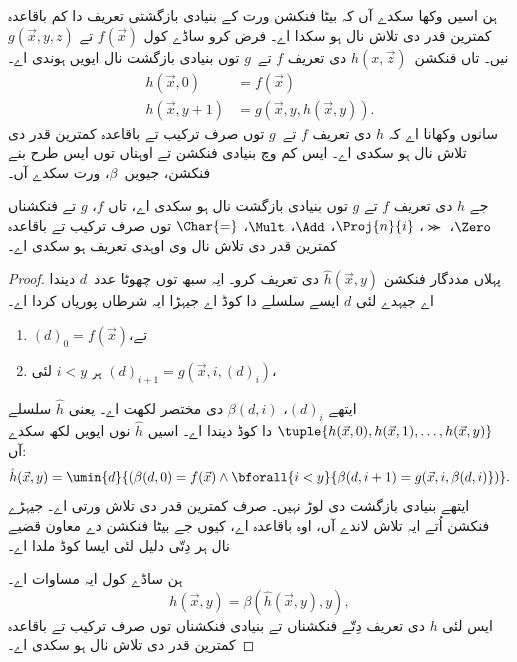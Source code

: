 \documentclass[../../../include/open-logic-section]{subfiles}
\begin{document}

ہن اسیں وکھا سکدے آں کہ بیٹا فنکشن ورت کے بنیادی بازگشتی
تعریف دا کم باقاعدہ کمترین قدر دی تلاش نال ہو سکدا اے۔ فرض کرو ساڈے کول
$f(\vec x)$ تے $g(\vec x, y, z)$
نیں۔ تاں فنکشن~$h(x,\vec z)$ دی تعریف $f$ تے~$g$ توں بنیادی بازگشت
نال ایویں ہوندی اے۔
\begin{align*}
h(\vec x, 0) & =  f(\vec x) \\
h(\vec x, y+1) & =  g(\vec x, y, h(\vec x, y)).
\end{align*}
سانوں وکھانا اے کہ $h$ دی تعریف $f$ تے~$g$ توں صرف ترکیب
تے باقاعدہ کمترین قدر دی تلاش نال ہو سکدی اے۔ ایس کم وچ
بنیادی فنکشن تے اوہناں توں ایس طرح بنے فنکشن، جیویں~$\beta$،
ورت سکدے آں۔

\begin{lem}
جے $h$ دی تعریف $f$ تے $g$ توں بنیادی بازگشت نال ہو سکدی اے،
تاں $f$، $g$ تے فنکشناں $\Zero$، $\Succ$، $\Proj{n}{i}$،
$\Add$، $\Mult$، $\Char{=}$ توں صرف ترکیب تے باقاعدہ کمترین قدر
دی تلاش نال وی اوہدی تعریف ہو سکدی اے۔
\end{lem}

\begin{proof}
پہلاں مددگار فنکشن $\hat h(\vec x, y)$ دی تعریف کرو۔ ایہ
سبھ توں چھوٹا عدد~$d$ دیندا اے جیہدے لئی $d$ ایسے سلسلے دا
کوڈ اے جیہڑا ایہ شرطاں پوریاں کردا اے۔
\begin{enumerate}
\item $(d)_0 = f(\vec x)$،تے
\item ہر $i < y$ لئی
  $(d)_{i+1} = g(\vec x, i, (d)_i)$،
\end{enumerate}
ایتھے $(d)_i$، $\beta(d,i)$ دی مختصر لکھت اے۔ یعنی $\hat h$
سلسلے $\tuple{h(\vec x, 0), h(\vec x, 1), \dots, h(\vec x, y)}$
دا کوڈ دیندا اے۔
اسیں $\hat h$
نوں ایویں لکھ
سکدے آں:
\[
\hat h(\vec x, y) = \umin{d}{(\beta(d,0) = f(\vec x) \land \bforall{i <
  y}{\beta(d,i+1) = g(\vec x, i,\beta(d,i)})}.
\]
ایتھے بنیادی بازگشت دی لوڑ نہیں۔ صرف کمترین قدر دی تلاش ورتی
اے۔ جیہڑے فنکشن اُتے ایہ
تلاش لاندے آں، اوہ باقاعدہ اے، کیوں جے بیٹا فنکشن دے معاون
قضیے  نال ہر دِتّی دلیل لئی ایسا کوڈ ملدا اے۔

ہن ساڈے کول ایہ مساوات اے۔
\[
h(\vec x, y) = \beta(\hat h(\vec x, y), y),
\]
ایس لئی $h$ دی تعریف دِتّے فنکشناں تے بنیادی فنکشناں توں صرف
ترکیب تے باقاعدہ کمترین قدر دی تلاش نال ہو سکدی اے۔
\end{proof}
\end{document}
